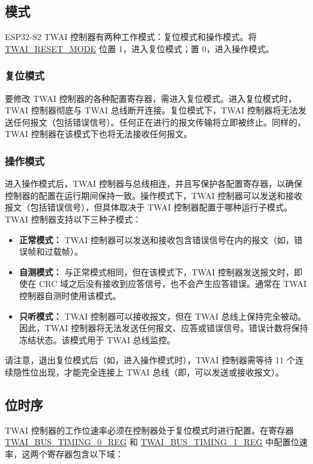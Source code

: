 \documentclass[main\_\_CN.tex]{subfiles}
\begin{document}
\subsection{模式}
\label{subsubsec:modes}
ESP32-S2 TWAI 控制器有两种工作模式：复位模式和操作模式。将 \hyperref[fielddesc:TWAIRESETMODE]{TWAI\_RESET\_MODE} 位置 1，进入复位模式；置 0，进入操作模式。

\subsubsection{复位模式}
要修改 TWAI 控制器的各种配置寄存器，需进入复位模式。进入复位模式时，TWAI 控制器彻底与 TWAI 总线断开连接。复位模式下，TWAI 控制器将无法发送任何报文（包括错误信号）。任何正在进行的报文传输将立即被终止。同样的，TWAI 控制器在该模式下也将无法接收任何报文。

\subsubsection{操作模式}
进入操作模式后，TWAI 控制器与总线相连，并且写保护各配置寄存器，以确保控制器的配置在运行期间保持一致。操作模式下，TWAI 控制器可以发送和接收报文（包括错误信号），但具体取决于 TWAI 控制器配置于哪种运行子模式。TWAI 控制器支持以下三种子模式：

\begin{itemize}
    \item {\bfseries 正常模式：} TWAI 控制器可以发送和接收包含错误信号在内的报文（如，错误帧和过载帧）。
    \item {\bfseries 自测模式：} 与正常模式相同，但在该模式下，TWAI 控制器发送报文时，即使在 CRC 域之后没有接收到应答信号，也不会产生应答错误。通常在 TWAI 控制器自测时使用该模式。
    \item {\bfseries 只听模式：} TWAI 控制器可以接收报文，但在 TWAI 总线上保持完全被动。因此，TWAI 控制器将无法发送任何报文、应答或错误信号。错误计数将保持冻结状态。该模式用于 TWAI 总线监控。
\end{itemize}

请注意，退出复位模式后（如，进入操作模式时），TWAI 控制器需等待 11 个连续隐性位出现，才能完全连接上 TWAI 总线（即，可以发送或接收报文）。

\subsection{位时序}
TWAI 控制器的工作位速率必须在控制器处于复位模式时进行配置。在寄存器 \\\hyperref[regdesc:TWAIBUSTIMING0REG]{TWAI\_BUS\_TIMING\_0\_REG} 和 \hyperref[regdesc:TWAIBUSTIMING1REG]{TWAI\_BUS\_TIMING\_1\_REG} 中配置位速率，这两个寄存器包含以下域：
\end{document}
